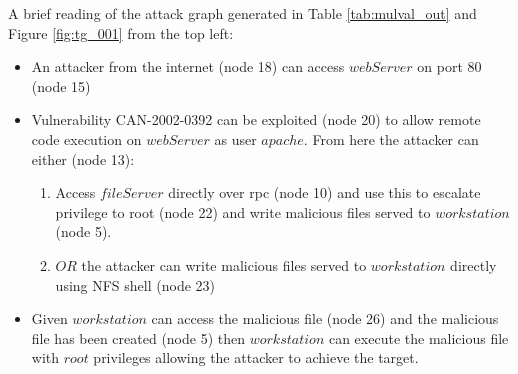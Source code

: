 

 A brief reading of the attack graph generated in Table \ref{tab:mulval_out} and Figure \ref{fig:tg_001} from the top left:
\begin{itemize}
\item An attacker from the internet (node 18) can access $webServer$ on port 80 (node 15)
\item Vulnerability CAN-2002-0392 can be exploited (node 20) to allow remote code execution on $webServer$ as user $apache$. From here the attacker can either (node 13):
\begin{enumerate}
\item Access $fileServer$ directly over rpc (node 10) and use this to escalate privilege to root (node 22) and write malicious files served to $workstation$ (node 5). 
\item $OR$ the attacker can write malicious files served to $workstation$ directly using NFS shell (node 23) 
\end{enumerate}
\item Given $workstation$ can access the malicious file (node 26) and the malicious file has been created (node 5) then $workstation$ can execute the malicious file with $root$ privileges allowing the attacker to achieve the target. 
\end{itemize}

